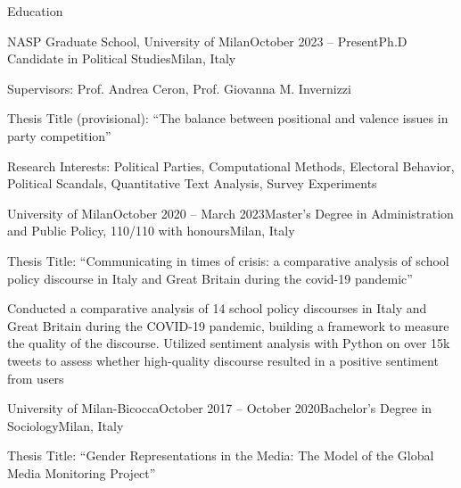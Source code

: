 \documentclass{cv} %
\begin{document}

\begin{rSection}{Education}

\begin{rSubsection}{NASP Graduate School, University of Milan}{October 2023 -- Present}{Ph.D Candidate in Political Studies}{Milan, Italy}
\item Supervisors: Prof. Andrea Ceron, Prof. Giovanna M. Invernizzi
\item Thesis Title (provisional): “The balance between positional and valence issues in party competition”
\item Research Interests: Political Parties, Computational Methods, Electoral Behavior, Political Scandals, Quantitative Text Analysis, Survey Experiments
\end{rSubsection}

\begin{rSubsection}{University of Milan}{October 2020 -- March 2023}{Master's Degree in Administration and Public Policy, 110/110 with honours}{Milan, Italy}
\item Thesis Title: “Communicating in times of crisis: a comparative analysis of school policy discourse in Italy and Great Britain during the covid-19 pandemic”
\item Conducted a comparative analysis of 14 school policy discourses in Italy and Great Britain during the COVID-19 pandemic, building a framework to measure the quality of the discourse. Utilized sentiment analysis with Python on over 15k tweets to assess whether high-quality discourse resulted in a positive sentiment from users
\end{rSubsection}

\begin{rSubsection}{University of Milan-Bicocca}{October 2017 -- October 2020}{Bachelor's Degree in Sociology}{Milan, Italy}
\item Thesis Title: “Gender Representations in the Media: The Model of the Global Media Monitoring Project”
\end{rSubsection}

\end{rSection}

\end{document}
